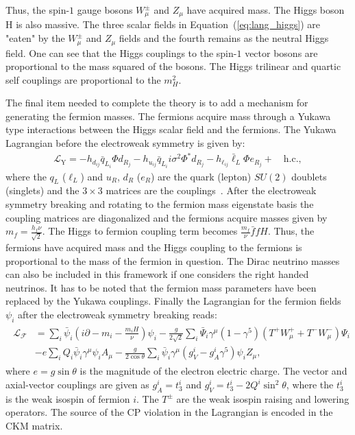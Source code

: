 Thus, the spin-$1$ gauge bosons $W_{\mu}^{\pm}$ and $Z_\mu$ have acquired mass. The Higgs boson H is also massive. The three scalar fields in Equation~(\ref{eq:lang_higgs}) are "eaten" by the $W_{\mu}^{\pm}$ and $Z_\mu$ fields and the fourth remains as the neutral Higgs field. One can see that the Higgs couplings to the spin-$1$ vector bosons are proportional to the mass squared of the bosons. The Higgs trilinear and quartic self couplings are proportional to the $m_{H}^2$.

The final item needed to complete the theory is to add a mechanism for generating the fermion masses. The fermions acquire mass through a Yukawa type interactions between the Higgs scalar field and the fermions. The Yukawa Lagrangian before the electroweak symmetry is given by:
\begin{eqnarray} \label{eq:yukawa}
\mathcal{L_{\mathrm{Y}}} = -h_{d_{ij}} \bar{q}_{L_{i}} \Phi d_{R_j}  - h_{u_{ij}} \bar{q}_{L_{i}} i\sigma^{2}\Phi^{*}d_{R_j} - h_{\ell_{ij}} \bar{\ell}_L \Phi e_{R_j} + \quad \mathrm{h.c.}, 
\end{eqnarray}   
where the $q_L$ ($\ell_L$) and $u_R$, $d_R$ ($e_R$) are the quark (lepton) $SU(2)$ doublets (singlets) and the $3\times3$ matrices are the couplings~\cite{Agashe:2014kda}. After the electroweak symmetry breaking and rotating to the fermion mass eigenstate basis the coupling matrices are diagonalized and the fermions acquire masses given by $m_{f} = \frac{h_f \nu}{\sqrt{2}}$. The Higgs to fermion coupling term becomes $\frac{m_{f}}{\nu}\bar{f}fH$. Thus, the fermions have acquired mass and the Higgs coupling to the fermions is proportional to the mass of the fermion in question. The Dirac neutrino masses can also be included in this framework if one considers the right handed neutrinos. It has to be noted that the fermion mass parameters have been replaced by the Yukawa couplings. Finally the Lagrangian for the fermion fields $\psi_{i}$ after the electroweak symmetry breaking reads:
\begin{eqnarray} \label{eq:lf}
\begin{aligned}
\mathcal{L_F} &= \sum_{i} \bar{\psi}_{i} (i\partial - m_{i} - \frac{m_{i}H}{\nu}) \psi_{i} -\frac{g}{2\sqrt{2}}\sum_{i}\bar{\Psi}_i \gamma^{\mu}(1-\gamma^5)(T^{+}W_{\mu}^{+} + T^{-} W_{\mu}^{-})\Psi_{i}  \\
& -e\sum_{i} Q_i \bar{\psi}_{i} \gamma^{\mu} \psi_i A_{\mu} - \frac{g}{2\cos\theta}\sum_{i}\bar{\psi}_i \gamma^{\mu}(g_{V}^{i}-g_{A}^{i}\gamma^{5})\psi_{i}Z_{\mu}, 
\end{aligned}
\end{eqnarray}
where $e=g \sin \theta$ is the magnitude of the electron electric charge. The vector and axial-vector couplings are given as $g_{A}^{i}=t^{i}_{3}$ and $g_{V}^{i}=t^{i}_{3}-2Q^{i} \sin^{2} \theta$, where the  $t^{i}_{3}$ is the weak isospin of fermion $i$. The $T^{\pm}$ are the weak isospin raising and lowering operators. The source of the CP violation in the Lagrangian is encoded in the CKM matrix.

